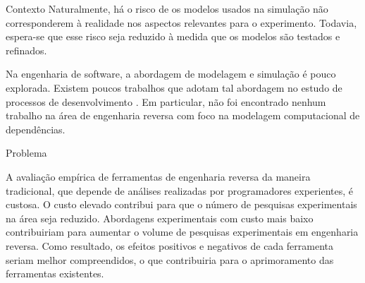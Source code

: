 \begin{section}{Contexto}
		Naturalmente, há o risco de os modelos usados na simulação não corresponderem à realidade nos aspectos relevantes para o experimento. Todavia, espera-se que esse risco seja reduzido à medida que os modelos são testados e refinados.

		Na engenharia de software, a abordagem de modelagem e simulação é pouco explorada. Existem poucos trabalhos que adotam tal abordagem no estudo de processos de desenvolvimento \cite{Stopford2008}. Em particular, não foi encontrado nenhum trabalho na área de engenharia reversa com foco na modelagem computacional de dependências.
		
\end{section}

\begin{section}{Problema}
	
	A avaliação empírica de ferramentas de engenharia reversa da maneira tradicional, que depende de análises realizadas por programadores experientes, é custosa. O custo elevado contribui para que o número de pesquisas experimentais na área seja reduzido. 
  Abordagens experimentais com custo mais baixo contribuiriam para aumentar o volume de pesquisas experimentais em engenharia reversa. Como resultado, os efeitos positivos e negativos de cada ferramenta seriam melhor compreendidos, o que contribuiria para o aprimoramento das ferramentas existentes.
	
	
\end{section}

